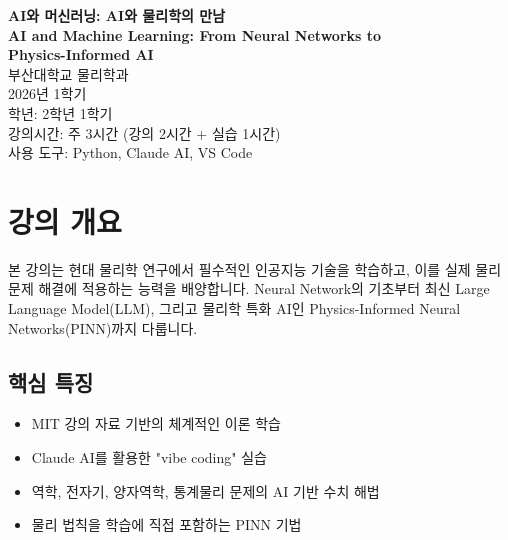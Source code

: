 \documentclass[11pt,a4paper]{article}
\begin{document}
\begin{center}
    {\Huge\bfseries\color{titleblue} AI와 머신러닝: AI와 물리학의 만남}\\[0.3cm]
    {\Large\textbf{AI and Machine Learning: From Neural Networks to}}\\
    {\Large\textbf{Physics-Informed AI}}\\[1cm]
    
    {\large 부산대학교 물리학과}\\[0.5cm]
    {\large 2026년 1학기}\\[0.3cm]
    {\large 학년: 2학년 1학기}\\[0.3cm]
    {\large 강의시간: 주 3시간 (강의 2시간 + 실습 1시간)}\\[0.3cm]
    {\large 사용 도구: Python, Claude AI, VS Code}\\[1cm]
\end{center}

\noindent{}

\vspace{0.5cm}

\section{강의 개요}

본 강의는 현대 물리학 연구에서 필수적인 인공지능 기술을 학습하고, 이를 실제 물리 문제 해결에 적용하는 능력을 배양합니다. Neural Network의 기초부터 최신 Large Language Model(LLM), 그리고 물리학 특화 AI인 Physics-Informed Neural Networks(PINN)까지 다룹니다.

\subsection*{핵심 특징}
\begin{itemize}[noitemsep]
    \item MIT 강의 자료 기반의 체계적인 이론 학습
    \item Claude AI를 활용한 "vibe coding" 실습
    \item 역학, 전자기, 양자역학, 통계물리 문제의 AI 기반 수치 해법
    \item 물리 법칙을 학습에 직접 포함하는 PINN 기법
\end{itemize}
\end{document}
